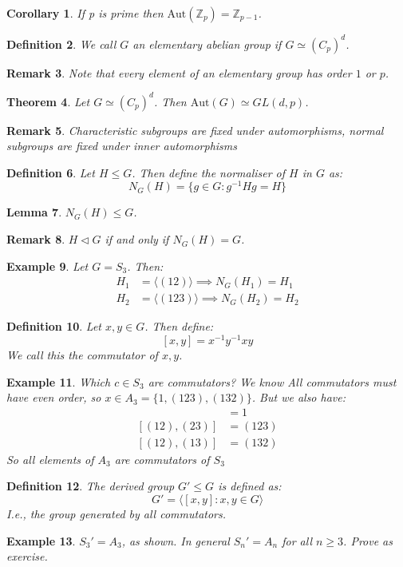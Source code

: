 \documentclass[a4paper,10pt]{article}
\newcommand{\ZZ}{\mathbb{Z}}
\newtheorem{thm}{Theorem}
\newtheorem{Def}[thm]{Definition}
\newtheorem{Cor}[thm]{Corollary}
\newtheorem{eg}[thm]{Example}
\newtheorem{Lem}[thm]{Lemma}
\newtheorem{rem}[thm]{Remark}
\begin{document}
\begin{Cor}
If p is prime then $\text{Aut}(\ZZ_p) = \ZZ_{p-1}$. 
\end{Cor}

\begin{Def}
We call $G$ an elementary abelian group if $G \simeq (C_p )^d$. 
\end{Def}

\begin{rem}
Note that every element of an elementary group has order $1$ or $p$.
\end{rem}

\begin{thm}
Let $G \simeq (C_p)^d$. Then $\text{Aut}(G) \simeq GL(d,p)$. 
\end{thm}

\begin{rem}
Characteristic subgroups are fixed under automorphisms, normal subgroups are fixed under inner automorphisms
\end{rem}

\begin{Def}
Let $H \leq G$. Then define the normaliser of $H$ in $G$ as:
\[ N_G(H) = \{ g \in G : g^{-1}Hg = H \} \]
\end{Def}
\begin{Lem}
$N_G(H) \leq G$. 
\end{Lem}
\begin{rem}
$H \triangleleft G$ if and only if $N_G(H) = G$. 
\end{rem}
\begin{eg}
Let $G = S_3$. Then:
\begin{align*}
H_1 &= \langle (12)\rangle \implies N_G(H_1) = H_1 \\
H_2 &= \langle (123) \rangle \implies N_G(H_2) = H_2 
\end{align*}

\end{eg}

\begin{Def}
Let $x,y \in G$. Then define:
\[ [x,y] = x^{-1} y^{-1} xy \]
We call this the commutator of $x,y$. 
\end{Def}
\begin{eg}
Which $c \in S_3$ are commutators? We know All commutators must have even order, so $x \in A_3 = \{ 1, (123), (132) \}$. But we also have:
\begin{align*}
[(12), (12)] &= 1 \\
[(12), (23)] &= (123) \\
[(12), (13)] &= (132)
\end{align*}
So all elements of $A_3$ are commutators of $S_3$
\end{eg}
\begin{Def}
The derived group $G' \leq G$ is defined as:
\[ G' = \langle [x,y] : x,y \in G \rangle \]
I.e., the group generated by all commutators. 
\end{Def}
\begin{eg}
$S_3 ' = A_3$, as shown. In general $S_n ' = A_n$ for all $n \geq 3$. Prove as exercise.
\end{eg}
\end{document}
